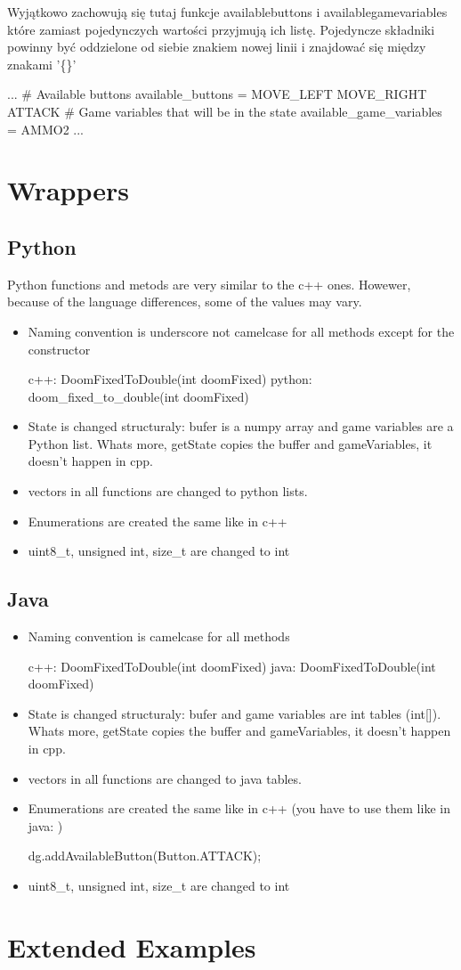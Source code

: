 Wyjątkowo zachowują się tutaj funkcje availablebuttons i availablegamevariables które zamiast pojedynczych wartości przyjmują ich listę. Pojedyncze składniki powinny być oddzielone od siebie znakiem nowej linii i znajdować się między znakami '\{\}'

\begin{cblock}
...
# Available buttons
available_buttons = 
	{ 
		MOVE_LEFT 
		MOVE_RIGHT 
		ATTACK 
	}
# Game variables that will be in the state
available_game_variables = { AMMO2}
...
\end{cblock}

\section{Wrappers}
\subsection{Python}
Python functions and metods are very similar to the c++ ones. Howewer, because of the language differences, some of the values may vary.
\begin{itemize}
\item Naming convention is underscore not camelcase for all methods except for the constructor
\begin{clinee}
c++: DoomFixedToDouble(int doomFixed)
python: doom\_fixed\_to\_double(int doomFixed)
\end{clinee}
\item State is changed structuraly: bufer is a numpy array and game variables are a Python list. Whats more, getState copies the buffer and gameVariables, it doesn't happen in cpp. 
\item vectors in all functions  are changed to python lists.
\item Enumerations are created the same like in c++
\item uint8\_t, unsigned int, size\_t are changed to int
\end{itemize}
\subsection{Java}
\begin{itemize}
\item Naming convention is camelcase for all methods
\begin{clinee}
c++: DoomFixedToDouble(int doomFixed)
java: DoomFixedToDouble(int doomFixed)
\end{clinee}
\item State is changed structuraly: bufer and game variables are int tables (int[]). Whats more, getState copies the buffer and gameVariables, it doesn't happen in cpp. 
\item vectors in all functions  are changed to java tables.
\item Enumerations are created the same like in c++ (you have to use them like in java: )
\begin{clinee}
 dg.addAvailableButton(Button.ATTACK);
\end{clinee}
\item uint8\_t, unsigned int, size\_t are changed to int
\end{itemize}
\section{Extended Examples}

